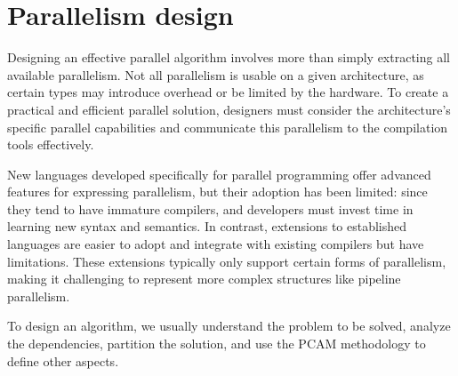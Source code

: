 \section{Parallelism design}

Designing an effective parallel algorithm involves more than simply extracting all available parallelism. 
Not all parallelism is usable on a given architecture, as certain types may introduce overhead or be limited by the hardware. 
To create a practical and efficient parallel solution, designers must consider the architecture's specific parallel capabilities and communicate this parallelism to the compilation tools effectively.

New languages developed specifically for parallel programming offer advanced features for expressing parallelism, but their adoption has been limited: since they tend to have immature compilers, and developers must invest time in learning new syntax and semantics.
In contrast, extensions to established languages are easier to adopt and integrate with existing compilers but have limitations. 
These extensions typically only support certain forms of parallelism, making it challenging to represent more complex structures like pipeline parallelism.

To design an algorithm, we usually understand the problem to be solved, analyze the dependencies, partition the solution, and use the PCAM methodology to define other aspects. 

